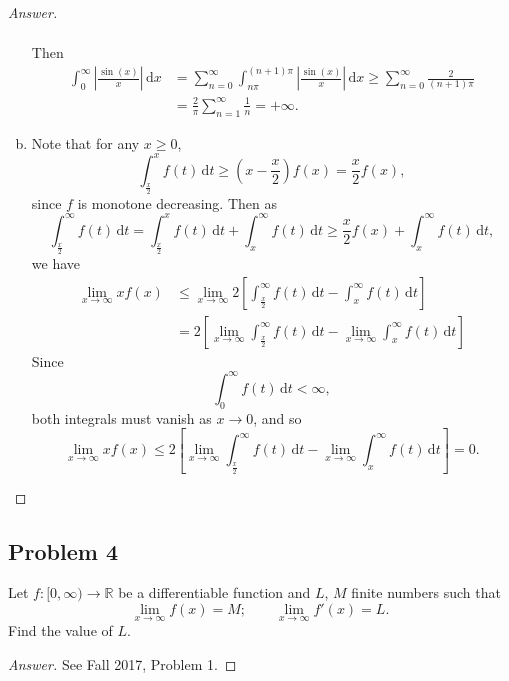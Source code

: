 \documentclass[12pt]{article}
\newcommand{\real}{\mathbb{R}}
\newcommand\paren[1]{\left( #1 \right)}
\newcommand{\sqbrack}[1]{\left [ #1 \right ]}
\newcommand{\abs}[1]{\left | #1 \right |}
\renewcommand{\i}[4]{\int_{#1}^{#2} {#3} \, \mathrm{d} {#4} }
\theoremstyle{definition}
\begin{document}
\begin{proof}[Answer]
\begin{enumerate}[(a)]
\begin{align*}
        \end{align*}
        Then 
        \begin{align*}
            \i{0}{\infty}{ \abs{ \frac{\sin(x)}{x} } }{x} & = \sum\limits_{n = 0}^{\infty} \i{n\pi}{(n+1)\pi}{ \abs{ \frac{\sin(x)}{x} } }{x} \geq \sum\limits_{n = 0}^{\infty} \frac{2}{(n+1)\pi} \\ 
            & = \frac{2}{\pi} \sum\limits_{n = 1}^{\infty} \frac{1}{n} = +\infty . 
        \end{align*}
        \item Note that for any $x \geq 0$, 
        \[
            \i{\frac{x}{2}}{x}{f(t)}{t} \geq \paren{ x - \frac{x}{2} } f(x) = \frac{x}{2} f(x) ,
        \]
        since $f$ is monotone decreasing. Then as
        \[
            \i{\frac{x}{2}}{\infty}{f(t)}{t} = \i{\frac{x}{2}}{x}{f(t)}{t} + \i{x}{\infty}{f(t)}{t} \geq \frac{x}{2} f(x) + \i{x}{\infty}{f(t)}{t} , 
        \]
        we have 
        \begin{align*}
            \lim\limits_{x \to \infty} x f(x) & \leq \lim\limits_{x \to \infty} 2 \sqbrack{ \i{\frac{x}{2}}{\infty}{f(t)}{t} - \i{x}{\infty}{f(t)}{t} } \\ 
            & = 2 \sqbrack{ \lim\limits_{x \to \infty} \i{\frac{x}{2}}{\infty}{f(t)}{t} - \lim\limits_{x \to \infty} \i{x}{\infty}{f(t)}{t} }
        \end{align*}
        Since 
        \[
            \i{0}{\infty}{f(t)}{t} < \infty , 
        \]
        both integrals must vanish as $x \to 0$, and so 
        \[
            \lim\limits_{x \to \infty} x f(x) \leq 2 \sqbrack{ \lim\limits_{x \to \infty} \i{\frac{x}{2}}{\infty}{f(t)}{t} - \lim\limits_{x \to \infty} \i{x}{\infty}{f(t)}{t} } = \boxed{0 .}
        \]
    \end{enumerate}
\end{proof}

\subsection{Problem 4 \texorpdfstring{\cite{Joel}}{}}
Let $f : [0,\infty) \to \real$ be a differentiable function and $L$, $M$ finite numbers such that 
\[
    \lim\limits_{x \to \infty} f(x) = M ; \qquad \lim\limits_{x \to \infty} f'(x) = L .
\]
Find the value of $L$.
\begin{proof}[Answer]
    See Fall 2017, Problem 1. 
\end{proof}
\end{document}
